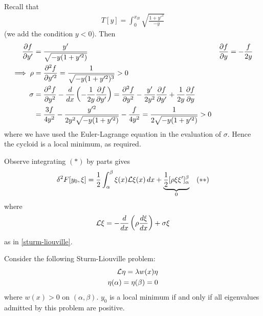 \documentclass{../template/note}
\begin{document}
    \begin{example*}[Brachistochrone]
        Recall that
        \begin{align*}
            T[y] = \int_0^{x_B} \sqrt{\frac{1+y'^2}{-y}}
        \end{align*}
        (we add the condition $y < 0$). Then
        \begin{align*}
            \pd{f}{y'} &= \frac{y'}{\sqrt{-y(1+y'^2)}} && \pd{f}{y} = -\frac{f}{2y} \\
            \implies \rho &= \pd{^2f}{y'^2} = \frac 1 {\sqrt{-y(1+y'^2)^3}} > 0 \\
            \sigma &= \pd{^2f}{y^2} - \frac{d}{dx} \left(-\frac{1}{2y} \pd{f}{y'}\right) = \pd{^2f}{y^2} - \frac{y'}{2y^2} \pd{f}{y'} + \frac 1 {2y} \pd{f}{y} \\
            &= \frac{3f}{4y^2} - \frac{y'^2}{2y^2\sqrt{-y(1+y'^2)}} - \frac{f}{4y^2} = \frac 1 {2\sqrt{-y(1+y'^2)}} > 0
        \end{align*}
        where we have used the Euler-Lagrange equation in the evaluation of $\sigma$. Hence the cycloid is a local minimum, as required.       
    \end{example*}
    
    Observe integrating $(*)$ by parts gives
    \begin{align*}
        \delta^2 F[y_0, \xi] = \frac 1 2 \int_\alpha^\beta \xi(x) \mathcal{L} \xi(x) \,d{x} + \underbrace{\frac 1 2 [\rho \xi \xi']_\alpha^\beta}_{0} && (**)
    \end{align*}
    where
    \begin{align*}
        \mathcal{L} \xi = -\frac d {dx} \left(\rho \frac{d\xi}{dx}\right) + \sigma \xi
    \end{align*}
    as in \cref{sturm-liouville}.
    
    \begin{proposition}
        Consider the following Sturm-Liouville problem:
        \begin{align*}
            \mathcal{L} \eta = \lambda w(x) \eta \\
            \eta(\alpha) = \eta(\beta) = 0
        \end{align*}
        where $w(x) > 0$ on $(\alpha, \beta)$. $y_0$ is a local minimum if and only if all eigenvalues admitted by this problem are positive.
    \end{proposition}
    
\end{document}
